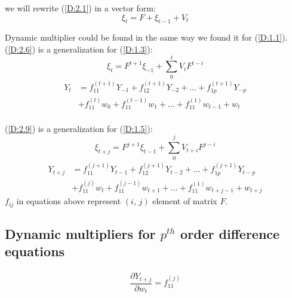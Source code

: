 \documentclass[12pt, english]{article}
\numberwithin{equation}{section} %
\theoremstyle{plain}
\theoremstyle{definition}
\newcommand{\pardv}[2]{\dfrac{\partial #1}{\partial #2}}
\begin{document}
we will rewrite (\ref{D:2.1}) in a vector form:
\begin{equation}
	\tag{D 2.4}
	\label{D:2.4}
	\xi_t = F+ \xi_{t-1} + V_t
\end{equation}

Dynamic multiplier could be found in the same way we found it for (\ref{D:1.1}).
(\ref{D:2.6}) is a generalization for (\ref{D:1.3}):
\begin{equation}
	\tag{D 2.6}
	\label{D:2.6}
	\xi_t = F^{t+1} \xi_{-1} + \sum\limits_0^t V_i F^{t-i}
\end{equation}
\begin{equation}
	\tag{D 2.8}
	\label{D:2.8}
	\begin{aligned}
		Y_t &= f^{(t+1)}_{11} Y_{-1} + f^{(t+1)}_{12} Y_{-2} + \dots + f^{(t+1)}_{1p} Y_{-p} \\
		&+ f^{(t)}_{11} w_0 + f^{(t-1)}_{11} w_1 + \dots + f^{(1)}_{11} w_{t-1} + w_t
	\end{aligned}
\end{equation} \\
(\ref{D:2.9}) is a generalization for (\ref{D:1.5}):
\begin{equation}
	\tag{D 2.9}
	\label{D:2.9}
	\xi_{t+j} = F^{j+1} \xi_{t-1} + \sum\limits_0^j V_{t+i} F^{j-i}
\end{equation}
\begin{equation}
	\tag{D 2.10}
	\label{D:2.10}
	\begin{aligned}
		Y_{t+j} &= f^{(j+1)}_{11} Y_{t-1} + f^{(j+1)}_{12} Y_{t-2} + \dots + f^{(j+1)}_{1p} Y_{t-p} \\
		&+ f^{(j)}_{11} w_t + f^{(j-1)}_{11} w_{t+1} + \dots + f^{(1)}_{11} w_{t+j-1} + w_{t+j}
	\end{aligned}
\end{equation}
$f_{ij}$ in equations above represent $(i,\, j)$ element of matrix $F$.

\subsection*{Dynamic multipliers for $p^{th}$ order difference equations}
\begin{align}
	\tag{D 2.11}
	\label{D:2.11}
	\pardv{Y_{t+j}}{w_t} = f^{(j)}_{11}
\end{align} \\[1em]
\end{document}
